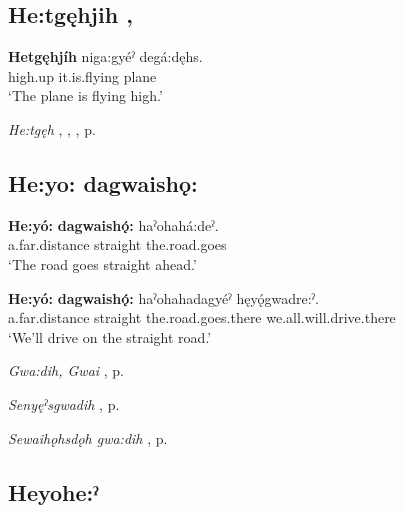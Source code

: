 \subsection*{\textbf{He:tgęhjih} , } \label{p:[he:tgęhjih]}

\ea
\label{ex:hpar20}
\gll \textbf{Hetgęhjíh} niga:gyéˀ degá:dęhs.\\
high.up it.is.flying plane\\
\glt ‘The plane is flying high.’
\z

\begin{CayugaRelated}
\item \textit{He:tgęh} , , , p. \pageref{p:[he:tgęh]}
\end{CayugaRelated}


\subsection*{\textbf{He:yo: dagwaishǫ:} } \label{p:[he:yo: dagwaishǫ:]}

\ea
\label{ex:hpar21}
\gll \textbf{He:yó:} \textbf{dagwaishǫ́:} haˀohahá:deˀ.\\
a.far.distance straight the.road.goes\\
\glt ‘The road goes straight ahead.’
\z

\ea
\label{ex:hpar22}
\gll \textbf{He:yó:} \textbf{dagwaishǫ́:} haˀohahadagyéˀ hęyǫ́gwadre:ˀ.\\
a.far.distance straight the.road.goes.there we.all.will.drive.there\\
\glt ‘We’ll drive on the straight road.’
\z

\begin{CayugaRelated}
\item \textit{Gwa:dih, Gwai} , p. \pageref{p:[gwa:dih]}\\
\item \textit{Senyęˀsgwadih} , p. \pageref{p:[senyęˀsgwadih]}\\
\item \textit{Sewaihǫhsdǫh gwa:dih} , p. \pageref{p:[sewaihǫhsdǫh gwa:dih]}
\end{CayugaRelated}

\subsection*{\textbf{Heyohe:ˀ} } \label{p:[heyohe:ˀ]}

